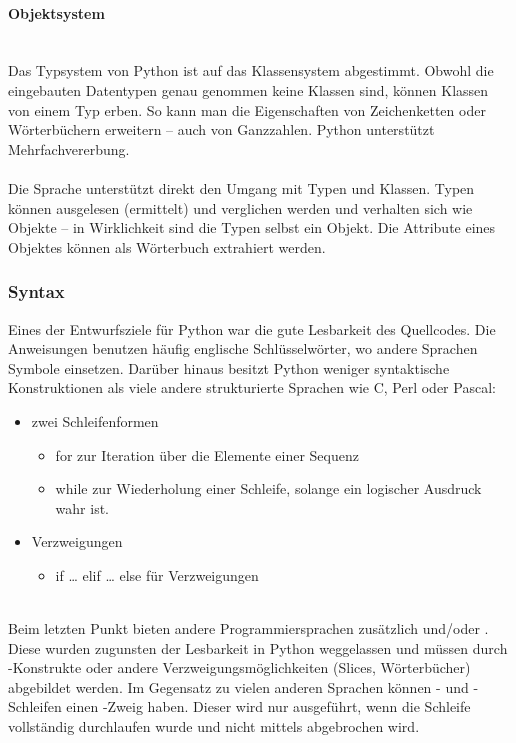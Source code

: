\paragraph{Objektsystem}\ \\

Das Typsystem von Python ist auf das Klassensystem abgestimmt. Obwohl die eingebauten Datentypen genau genommen keine Klassen sind, können Klassen von einem Typ erben. So kann man die Eigenschaften von Zeichenketten oder Wörterbüchern erweitern – auch von Ganzzahlen. Python unterstützt Mehrfachvererbung.\\
\\
Die Sprache unterstützt direkt den Umgang mit Typen und Klassen. Typen können ausgelesen (ermittelt) und verglichen werden und verhalten sich wie Objekte – in Wirklichkeit sind die Typen selbst ein Objekt. Die Attribute eines Objektes können als Wörterbuch extrahiert werden.

\subsubsection{Syntax}
Eines der Entwurfsziele für Python war die gute Lesbarkeit des Quellcodes. Die Anweisungen benutzen häufig englische Schlüsselwörter, wo andere Sprachen Symbole einsetzen. Darüber hinaus besitzt Python weniger syntaktische Konstruktionen als viele andere strukturierte Sprachen wie C, Perl oder Pascal:\\
\begin{itemize}
\item zwei Schleifenformen
	\begin{itemize}
		\item for zur Iteration über die Elemente einer Sequenz
		\item while zur Wiederholung einer Schleife, solange ein logischer Ausdruck wahr ist.
	\end{itemize}
\item Verzweigungen
	\begin{itemize}
		\item if … elif … else für Verzweigungen
	\end{itemize}
\end{itemize}
\ \\
Beim letzten Punkt bieten andere Programmiersprachen zusätzlich  und/oder . Diese wurden zugunsten der Lesbarkeit in Python weggelassen und müssen durch -Konstrukte oder andere Verzweigungsmöglichkeiten (Slices, Wörterbücher) abgebildet werden. Im Gegensatz zu vielen anderen Sprachen können - und -Schleifen einen -Zweig haben. Dieser wird nur ausgeführt, wenn die Schleife vollständig durchlaufen wurde und nicht mittels  abgebrochen wird.

